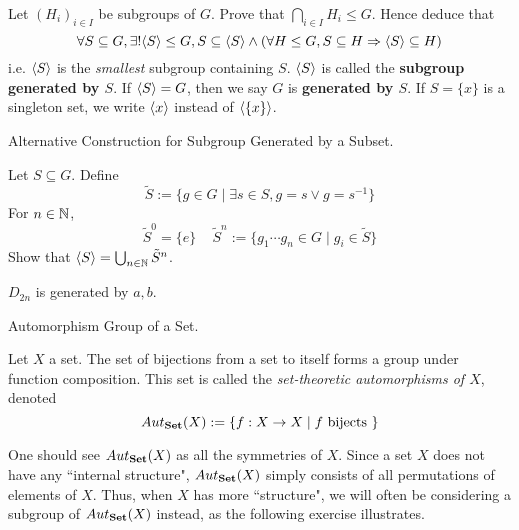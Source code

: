 \documentclass[../../book.tex]{subfiles}
\begin{document}
\begin{ex}
    
    Let $(H_i)_{i \in I}$ be subgroups of $G$. 
    Prove that $\bigcap_{i \in I} H_i \leq G$. 
    Hence deduce that 
    \[
        \forall S \subseteq G, \exists ! \langle S\rangle \leq G, 
        S \subseteq \langle S \rangle \land 
        \left(\forall H \leq G, S \subseteq H \Rightarrow \langle S \rangle \subseteq H \right) 
    \]
    i.e. $\langle S \rangle$ is the \emph{smallest} subgroup containing $S$.
    $\langle S \rangle$ is called the \textbf{subgroup generated by $S$}. 
    If $\langle S\rangle = G$, then we say $G$ is \textbf{generated by $S$}.
    If $S = \{x\}$ is a singleton set, 
    we write $\langle x \rangle$ instead of $\langle \{x\} \rangle$. 
    
\end{ex}
\begin{ex} Alternative Construction for Subgroup Generated by a Subset.

    Let $S \subseteq G$. 
    Define \[
        \tilde{S} := \{g \in G \mid \exists s \in S, g = s \lor g = s^{-1}\}
    \]
    For $n \in \mathbb{N}$, 
    \[
        \tilde{S}^0 = \{e\} \,\,\,\,\,\,\,
        \tilde{S}^n := \{g_1\cdots g_n \in G \mid g_i \in \tilde{S}\}
    \]
    Show that $\langle S \rangle = \bigcup_{n \in \mathbb{N}} \tilde{S}^n$. 
\end{ex}
\begin{eg} 
    $D_{2n}$ is generated by $a, b$. 
\end{eg}
\begin{dfn} Automorphism Group of a Set. 

    Let $X$ a set. 
    The set of bijections from a set to itself
    forms a group under function composition. 
    This set is called the \emph{set-theoretic automorphisms of $X$}, denoted
    \[Aut_{\mathbf{Set}}(X) := \{f : X \to X \mid f \text{ bijects }\}\] 
\end{dfn}

\begin{rmk}

    One should see $Aut_{\mathbf{Set}}(X)$ as all the symmetries of $X$. 
    Since a set $X$ does not have any ``internal structure", 
    $Aut_{\mathbf{Set}}(X)$ simply consists of all permutations of elements of $X$. 
    Thus, when $X$ has more ``structure", 
    we will often be considering a subgroup of $Aut_{\mathbf{Set}}(X)$ instead, 
    as the following exercise illustrates. 
    
\end{rmk}
\end{document}

